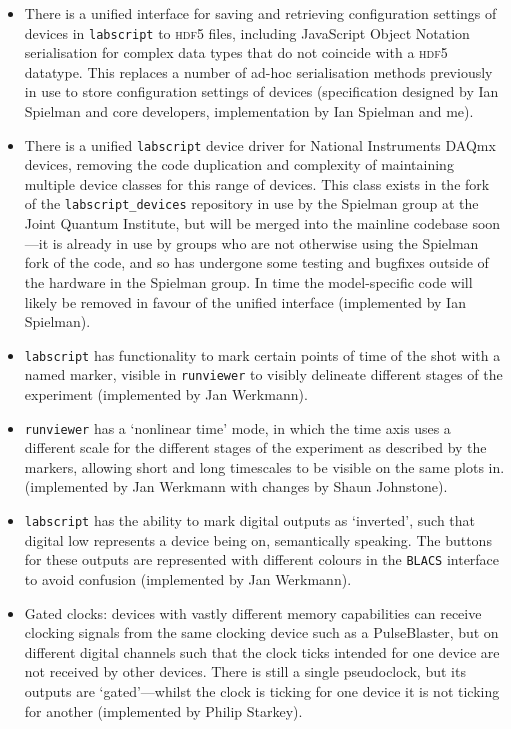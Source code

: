 \begin{itemize}
    \item There is a unified interface for saving and retrieving configuration settings of devices in \texttt{labscript} to \textsc{hdf5} files, including JavaScript Object Notation serialisation for complex data types that do not coincide with a \textsc{hdf5} datatype. This replaces a number of ad-hoc serialisation methods previously in use to store configuration settings of devices (specification designed by Ian Spielman and core developers, implementation by Ian Spielman and me).
    
    \item There is a unified \texttt{labscript} device driver for National Instruments DAQmx devices, removing the code duplication and complexity of maintaining multiple device classes for this range of devices. This class exists in the fork of the \texttt{labscript\_devices} repository in use by the Spielman group at the Joint Quantum Institute, but will be merged into the mainline codebase soon---it is already in use by groups who are not otherwise using the Spielman fork of the code, and so has undergone some testing and bugfixes outside of the hardware in the Spielman group. In time the model-specific code will likely be removed in favour of the unified interface (implemented by Ian Spielman).
    
    \item \texttt{labscript} has functionality to mark certain points of time of the shot with a named marker, visible in \texttt{runviewer} to visibly delineate different stages of the experiment (implemented by Jan Werkmann).
    
    \item \texttt{runviewer} has a `nonlinear time' mode, in which the time axis uses a different scale for the different stages of the experiment as described by the markers, allowing short and long timescales to be visible on the same plots in. (implemented by Jan Werkmann with changes by Shaun Johnstone).
    
    \item \texttt{labscript} has the ability to mark digital outputs as `inverted', such that digital low represents a device being on, semantically speaking. The buttons for these outputs are represented with different colours in the \texttt{BLACS} interface to avoid confusion (implemented by Jan Werkmann).
    
    \item Gated clocks: devices with vastly different memory capabilities can receive clocking signals from the same clocking device such as a PulseBlaster, but on different digital channels such that the clock ticks intended for one device are not received by other devices. There is still a single pseudoclock, but its outputs are `gated'---whilst the clock is ticking for one device it is not ticking for another (implemented by Philip Starkey).
    

\end{itemize}

